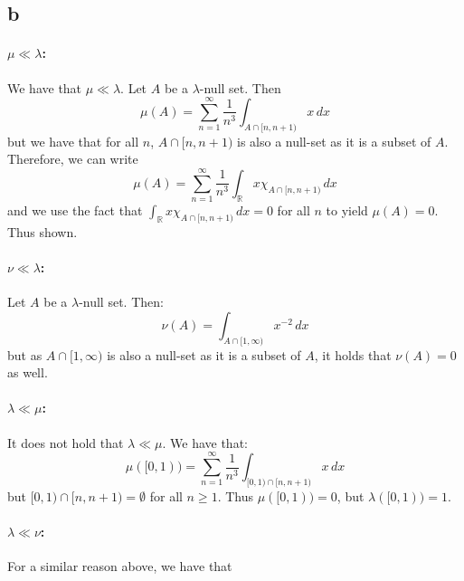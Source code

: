 \documentclass{article}
\theoremstyle{definition}
\numberwithin{theorem}{section}
\numberwithin{equation}{section}
\begin{document}
\subsection{b}
\paragraph{$\mu \ll\lambda$:}

We have that $\mu \ll\lambda$. Let $A$ be a $\lambda$-null set. Then
\begin{equation}
	\mu(A) = \sum_{n = 1}^{\infty} \frac{1}{n^3} \int_{A\cap [n, n + 1)} x \, dx 
\end{equation}
but we have that for all $n$, $A\cap [n, n + 1)$ is also a null-set as it is a subset of $A$. Therefore, we can write
\begin{equation}
	\mu(A) = \sum_{n = 1}^{\infty} \frac{1}{n^3} \int_{\mathbb{R}} x \chi_{A\cap [n, n + 1)} \, dx 
\end{equation}
and we use the fact that $\int_{\mathbb{R}} x \chi_{A\cap [n, n + 1)} \, dx  = 0$ for all $n$ to yield $\mu(A) = 0$. Thus shown.

\paragraph{$\nu \ll\lambda$:}

Let $A$ be a $\lambda$-null set. Then:
\begin{equation}
	\nu(A) = \int_{A \cap [1, \infty)} x^{-2} \, dx
\end{equation}
but as $A \cap [1, \infty)$ is also a null-set as it is a subset of $A$, it holds that $\nu(A) = 0$ as well. 

\paragraph{$\lambda \ll \mu$:}
It does not hold that $\lambda \ll \mu$. We have that:
\begin{equation}
	\mu([0, 1)) = 
	\sum_{n = 1}^{\infty} \frac{1}{n^3} \int_{[0, 1)\cap [n, n + 1)} x\, dx 
\end{equation}
but $[0, 1)\cap [n, n + 1) = \emptyset$ for all $n \geq 1$. Thus $\mu([0, 1)) = 0$, but $\lambda([0, 1)) = 1$. 

\paragraph{$\lambda \ll \nu$:}
For a similar reason above, we have that
\end{document}
